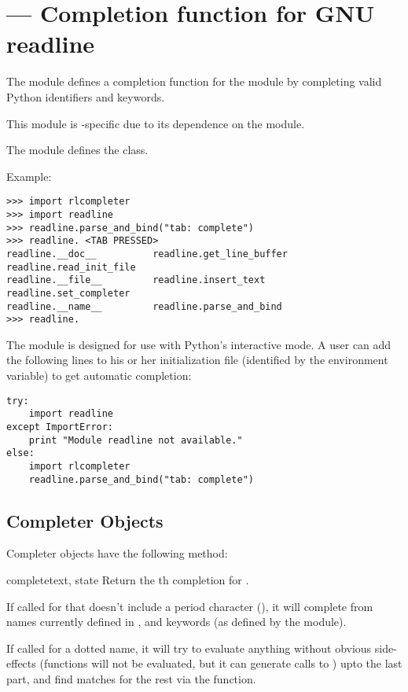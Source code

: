 \section{ ---
         Completion function for GNU readline}


The  module defines a completion function for
the  module by completing valid Python identifiers
and keywords.

This module is \UNIX-specific due to its dependence on the
 module.

The  module defines the  class.

Example:

\begin{verbatim}
>>> import rlcompleter
>>> import readline
>>> readline.parse_and_bind("tab: complete")
>>> readline. <TAB PRESSED>
readline.__doc__          readline.get_line_buffer  readline.read_init_file
readline.__file__         readline.insert_text      readline.set_completer
readline.__name__         readline.parse_and_bind
>>> readline.
\end{verbatim}

The  module is designed for use with Python's
interactive mode.  A user can add the following lines to his or her
initialization file (identified by the 
environment variable) to get automatic  completion:

\begin{verbatim}
try:
    import readline
except ImportError:
    print "Module readline not available."
else:
    import rlcompleter
    readline.parse_and_bind("tab: complete")
\end{verbatim}


\subsection{Completer Objects \label{completer-objects}}

Completer objects have the following method:

\begin{methoddesc}[Completer]{complete}{text, state}
Return the th completion for .

If called for  that doesn't include a period character
(), it will complete from names currently defined in
,  and
keywords (as defined by the  module).

If called for a dotted name, it will try to evaluate anything without
obvious side-effects (functions will not be evaluated, but it
can generate calls to ) upto the last part, and
find matches for the rest via the  function.
\end{methoddesc}
